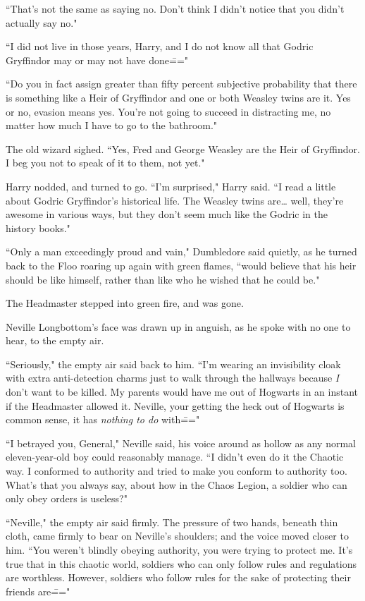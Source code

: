 ``That's not the same as saying no. Don't think I didn't notice that you didn't actually say no."

``I did not live in those years, Harry, and I do not know all that Godric Gryffindor may or may not have done\==="

``Do you in fact assign greater than fifty percent subjective probability that there is something like a Heir of Gryffindor and one or both Weasley twins are it. Yes or no, evasion means yes. You're not going to succeed in distracting me, no matter how much I have to go to the bathroom."

The old wizard sighed. ``Yes, Fred and George Weasley are the Heir of Gryffindor. I beg you not to speak of it to them, not yet."

Harry nodded, and turned to go. ``I'm surprised," Harry said. ``I read a little about Godric Gryffindor's historical life. The Weasley twins are{\ldots} well, they're awesome in various ways, but they don't seem much like the Godric in the history books."

``Only a man exceedingly proud and vain," Dumbledore said quietly, as he turned back to the Floo roaring up again with green flames, ``would believe that his heir should be like himself, rather than like who he wished that he could be."

The Headmaster stepped into green fire, and was gone.


Neville Longbottom's face was drawn up in anguish, as he spoke with no one to hear, to the empty air.

``Seriously," the empty air said back to him. ``I'm wearing an invisibility cloak with extra anti-detection charms just to walk through the hallways because \emph{I} don't want to be killed. My parents would have me out of Hogwarts in an instant if the Headmaster allowed it. Neville, your getting the heck out of Hogwarts is common sense, it has \emph{nothing to do} with\==="

``I betrayed you, General," Neville said, his voice around as hollow as any normal eleven-year-old boy could reasonably manage. ``I didn't even do it the Chaotic way. I conformed to authority and tried to make you conform to authority too. What's that you always say, about how in the Chaos Legion, a soldier who can only obey orders is useless?"

``Neville," the empty air said firmly. The pressure of two hands, beneath thin cloth, came firmly to bear on Neville's shoulders; and the voice moved closer to him. ``You weren't blindly obeying authority, you were trying to protect me. It's true that in this chaotic world, soldiers who can only follow rules and regulations are worthless. However, soldiers who follow rules for the sake of protecting their friends are\==="

